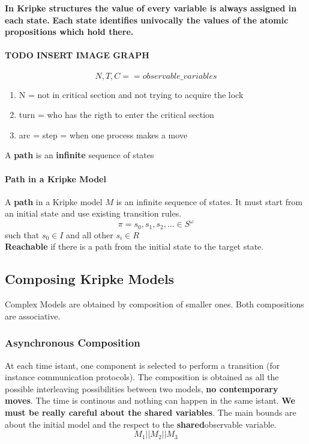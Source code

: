 \documentclass[11pt]{article}
\begin{document}
\textbf{In Kripke structures the value of every variable is always assigned in each state.}
\textbf{Each state identifies univocally the values of the atomic propositions which hold there.}

\paragraph{TODO INSERT IMAGE GRAPH} %
\label{par:todo_insert_image_graph}
\[
	N,T,C == observable\_variables	
\]
\begin{enumerate}
	\item N = not in critical section and not trying to acquire the lock
	\item turn = who has the rigth to enter the critical section
	\item arc = step = when one process makes a move
\end{enumerate}
A \textbf{path} is an \textbf{infinite} sequence of states

\paragraph{Path in a Kripke Model} %
\label{par:path_in_a_kripke_model}

A \textbf{path} in a Kripke model $M$ is an infinite sequence of states.  It must start from an initial state and use existing transition rules. 
\[
	\pi = s_0, s_1, s_2, \ldots \in S^{\omega}
\]
such that $s_0 \in I$ and all other $s_i \in R$ \\
\textbf{Reachable} if there is a path from the initial state to the target state.\\

\subsection{Composing Kripke Models} %
\label{sub:composing_kripke_models}

Complex Models are obtained by composition of smaller ones.
Both compositions are associative. 

\subsubsection{Asynchronous Composition} %
\label{ssub:asynchronous_composition}
At each time istant, one component is selected to perform a transition (for instance communication protocols).
The composition is obtained as all the possible interleaving possibilities between two models, \textbf{no contemporary moves}. The time is continous and nothing can happen in the same istant. \textbf{We must be really careful about the shared variables}. The main bounds are about the initial model and the respect to the \textbf{shared}observable variable.
\[
	M_1 || M_2 || M_3
\]
\end{document}
